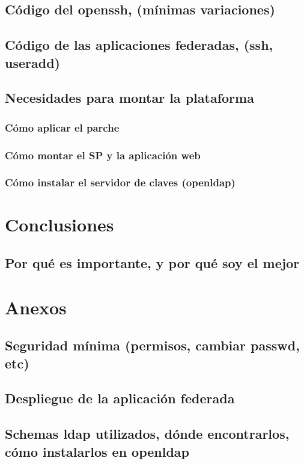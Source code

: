     \section{Código del openssh, (mínimas variaciones)}
    \section{Código de las aplicaciones federadas, (ssh, useradd)}
    \section{Necesidades para montar la plataforma}
        \subsection{Cómo aplicar el parche}
        \subsection{Cómo montar el SP y la aplicación web}
        \subsection{Cómo instalar el servidor de claves (openldap)}


\chapter{Conclusiones}
    \section{Por qué es importante, y por qué soy el mejor}



\chapter{Anexos}
    \section{Seguridad mínima (permisos, cambiar passwd, etc)}
    \section{Despliegue de la aplicación federada}
    \section{Schemas ldap utilizados, dónde encontrarlos, cómo instalarlos
    en openldap}

\newpage



